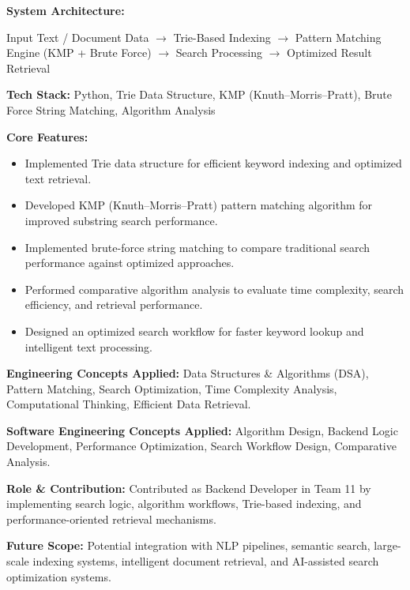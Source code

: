 \documentclass[a4paper,11pt]{article}
\begin{document}
\textbf{System Architecture:}

Input Text / Document Data
$\rightarrow$ Trie-Based Indexing
$\rightarrow$ Pattern Matching Engine
(KMP + Brute Force)
$\rightarrow$ Search Processing
$\rightarrow$ Optimized Result Retrieval

\textbf{Tech Stack:}
Python, Trie Data Structure, KMP (Knuth--Morris--Pratt), Brute Force String Matching, Algorithm Analysis

\textbf{Core Features:}
\begin{itemize}

    \item Implemented Trie data structure for efficient keyword indexing and optimized text retrieval.

    \item Developed KMP (Knuth--Morris--Pratt) pattern matching algorithm for improved substring search performance.

    \item Implemented brute-force string matching to compare traditional search performance against optimized approaches.

    \item Performed comparative algorithm analysis to evaluate time complexity, search efficiency, and retrieval performance.

    \item Designed an optimized search workflow for faster keyword lookup and intelligent text processing.

\end{itemize}

\textbf{Engineering Concepts Applied:}
Data Structures \& Algorithms (DSA), Pattern Matching, Search Optimization, Time Complexity Analysis, Computational Thinking, Efficient Data Retrieval.

\textbf{Software Engineering Concepts Applied:}
Algorithm Design, Backend Logic Development, Performance Optimization, Search Workflow Design, Comparative Analysis.

\textbf{Role \& Contribution:}
Contributed as Backend Developer in Team 11 by implementing search logic, algorithm workflows, Trie-based indexing, and performance-oriented retrieval mechanisms.

\textbf{Future Scope:}
Potential integration with NLP pipelines, semantic search, large-scale indexing systems, intelligent document retrieval, and AI-assisted search optimization systems.
\end{document}
